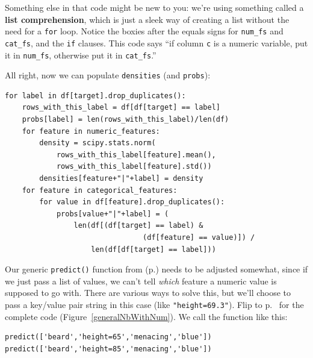 
Something else in that code might be new to you: we're using something called a
\textbf{list comprehension}, which is just a sleek way of creating a list
without the need for a \texttt{for} loop. Notice the boxies after the equals
signs for \texttt{num\_fs} and \texttt{cat\_fs}, and the \texttt{if} clauses.
This code says ``if column \texttt{c} is a numeric variable, put it in
\texttt{num\_fs}, otherwise put it in \texttt{cat\_fs}.''

\medskip

All right, now we can populate \texttt{densities} (and \texttt{probs}):

\begin{Verbatim}[fontsize=\small,samepage=true,frame=single,framesep=3mm]
for label in df[target].drop_duplicates():
    rows_with_this_label = df[df[target] == label]
    probs[label] = len(rows_with_this_label)/len(df)
    for feature in numeric_features:
        density = scipy.stats.norm(
            rows_with_this_label[feature].mean(),
            rows_with_this_label[feature].std())
        densities[feature+"|"+label] = density
    for feature in categorical_features:
        for value in df[feature].drop_duplicates():
            probs[value+"|"+label] = (
                len(df[(df[target] == label) &
                                (df[feature] == value)]) / 
                    len(df[df[target] == label]))
\end{Verbatim}


Our generic \texttt{predict()} function from
(p.\pageref{codingNbGenerallyPredict}) needs to be adjusted somewhat, since if
we just pass a list of values, we can't tell \textit{which} feature a numeric
value is supposed to go with. There are various ways to solve this, but we'll
choose to pass a key/value pair string in this case (like
\texttt{"height=69.3"}). Flip to p.~\pageref{generalNbWithNum} for the complete
code (Figure~\ref{generalNbWithNum}). We call the function like this:

\begin{Verbatim}[fontsize=\small,samepage=true,frame=single,framesep=3mm]
predict(['beard','height=65','menacing','blue'])
predict(['beard','height=85','menacing','blue'])
\end{Verbatim}
\vspace{-.2in}

